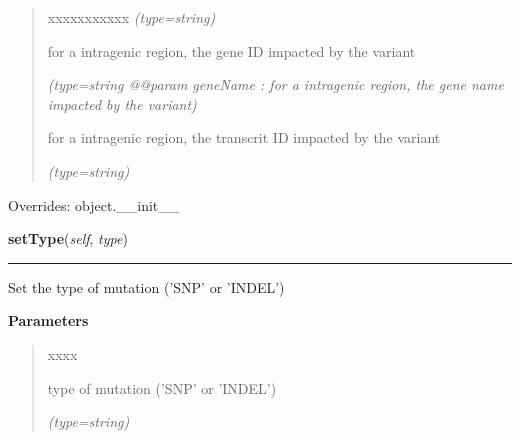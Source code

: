 \begin{boxedminipage}{\funcwidth}
\begin{quote}
\begin{Ventry}{xxxxxxxxxxx}
            {\it (type=string)}

          \item[geneID]

          for a intragenic region, the gene ID impacted by the variant

            {\it (type=string @@param geneName : for a intragenic region, the gene name impacted 
by the variant)}

          \item[transcritID]

          for a intragenic region, the transcrit ID impacted by the variant

            {\it (type=string)}

        \end{Ventry}

      \end{quote}

      Overrides: object.\_\_init\_\_

    \end{boxedminipage}

    \label{script-phyloFixedVar:var:setType}

    \vspace{0.5ex}

\hspace{.8\funcindent}\begin{boxedminipage}{\funcwidth}

    \raggedright \textbf{setType}(\textit{self}, \textit{type})

    \vspace{-1.5ex}

    \rule{\textwidth}{0.5\fboxrule}
\setlength{\parskip}{2ex}
    Set the type of mutation ('SNP' or 'INDEL')

\setlength{\parskip}{1ex}
      \textbf{Parameters}
      \vspace{-1ex}

      \begin{quote}
        \begin{Ventry}{xxxx}

          \item[type]

          type of mutation ('SNP' or 'INDEL')

            {\it (type=string)}

        \end{Ventry}

      \end{quote}

    \end{boxedminipage}

